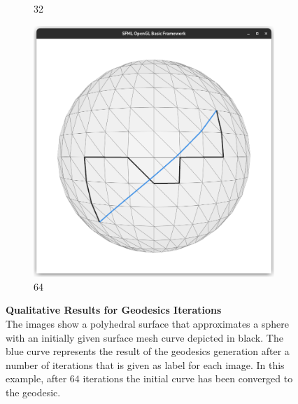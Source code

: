 \documentclass{stdlocal}
\begin{document}
\begin{figure}
\begin{subfigure}[b]{0.24\linewidth}
    \caption{32}
  \end{subfigure}
  \begin{subfigure}[b]{0.24\linewidth}
    \centering
    \includegraphics[width=\linewidth,trim={15px 20 15 50},clip]{images/sphere-geodesic-1-iteration-64.png}
    \caption{64}
  \end{subfigure}
  \caption[Qualitative Results for Geodesics Iterations]{%
    \textbf{Qualitative Results for Geodesics Iterations}\\
    The images show a polyhedral surface that approximates a sphere with an initially given surface mesh curve depicted in black.
    The blue curve represents the result of the geodesics generation after a number of iterations that is given as label for each image.
    In this example, after $64$ iterations the initial curve has been converged to the geodesic.
  }
  \label{fig:results-geodesic-iterations}
\end{figure}


\end{document}

